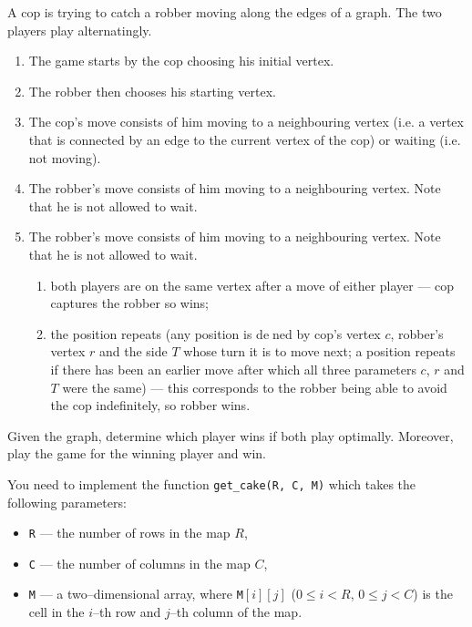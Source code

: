 \documentclass{boi2014}
\newcommand{\param}[1]{{\tt #1}}
\newcommand{\method}[1]{{\tt #1}}
\begin{document}
    A cop is trying to catch a robber moving along the edges of a graph. The
    two players play alternatingly.

    \begin{enumerate}
        \item The game starts by the cop choosing his initial vertex.
        \item The robber then chooses his starting vertex.
        \item The cop's move consists of him moving to a neighbouring vertex
        (i.e.  a vertex that is connected by an edge to the current vertex of
        the cop) or waiting (i.e. not moving).
        \item The robber's move consists of him moving to a neighbouring
        vertex. Note that he is not allowed to wait.
        \item The robber's move consists of him moving to a neighbouring vertex.
        Note that he is not allowed to wait.
        \begin{enumerate}
            \item both players are on the same vertex after a move of either
            player --- cop captures the robber so wins;
            \item the position repeats (any position is dened by cop's vertex
            $c$, robber's vertex $r$ and the side $T$ whose turn it is to move
            next; a position repeats if there has been an earlier move after
            which all three parameters $c$, $r$ and $T$ were the same) --- this
            corresponds to the robber being able to avoid the cop indefinitely,
            so robber wins.
        \end{enumerate}
    \end{enumerate}

    \Task
    Given the graph, determine which player wins if both play optimally.
    Moreover, play the game for the winning player and win.

    \Implementation
    You need to implement the function \method{get\_cake(R, C, M)}
    which takes the following parameters:
    \begin{itemize}
        \item \param{R} --- the number of rows in the map $R$,
        \item \param{C} --- the number of columns in the map $C$,
        \item \param{M} --- a two--dimensional array, where
            \param{M}$[i][j]$ ($0 \le i < R$, $0 \le j < C$) is the cell in
             the $i$--th row and $j$--th column of the map.
    \end{itemize}
\end{document}
